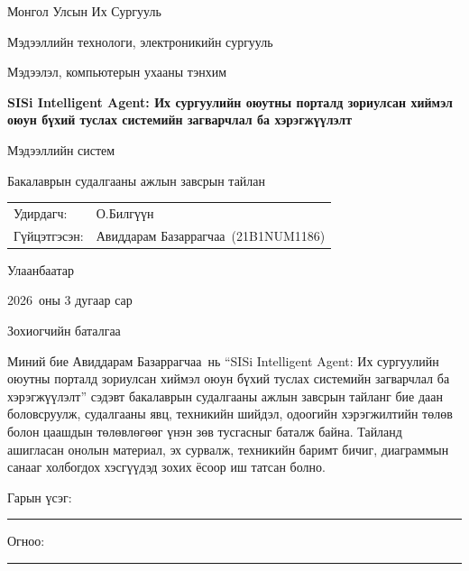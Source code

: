 \documentclass[12pt,a4paper]{report}
\newcommand{\UniversityName}{Монгол Улсын Их Сургууль}
\newcommand{\SchoolName}{Мэдээллийн технологи, электроникийн сургууль}
\newcommand{\DepartmentName}{Мэдээлэл, компьютерын ухааны тэнхим}
\newcommand{\ProgramName}{Мэдээллийн систем}
\newcommand{\StudentName}{Авиддарам Базаррагчаа}
\newcommand{\StudentCode}{21B1NUM1186}
\newcommand{\AdvisorName}{О.Билгүүн}
\newcommand{\ReportTitle}{SISi Intelligent Agent: Их сургуулийн оюутны порталд зориулсан хиймэл оюун бүхий туслах системийн загварчлал ба хэрэгжүүлэлт}
\newcommand{\ReportCity}{Улаанбаатар}
\newcommand{\ReportYear}{2026}
\begin{document}
\begin{titlepage}
  \begin{center}
    {\large \UniversityName \par}
    \vspace{0.2cm}
    {\large \SchoolName \par}
    \vspace{0.2cm}
    {\large \DepartmentName \par}

    \vfill

    {\bfseries\LARGE \ReportTitle \par}
    \vspace{0.6cm}
    {\large \ProgramName \par}
    \vspace{0.4cm}
    {\large Бакалаврын судалгааны ажлын завсрын тайлан \par}

    \vfill

    \begin{tabular}{p{5cm}p{8cm}}
      Удирдагч: & \AdvisorName \\
      Гүйцэтгэсэн: & \StudentName\ (\StudentCode) \\
    \end{tabular}

    \vfill

    {\large \ReportCity \par}
    {\large \ReportYear\ оны 3 дугаар сар \par}
  \end{center}
\end{titlepage}

\cleardoublepage
\thispagestyle{empty}
\begin{center}
  {\Large Зохиогчийн баталгаа}
\end{center}
\vspace{0.8cm}

Миний бие \StudentName\ нь ``\ReportTitle'' сэдэвт бакалаврын судалгааны ажлын завсрын тайланг бие даан боловсруулж, судалгааны явц, техникийн шийдэл, одоогийн хэрэгжилтийн төлөв болон цаашдын төлөвлөгөөг үнэн зөв тусгасныг баталж байна. Тайланд ашигласан онолын материал, эх сурвалж, техникийн баримт бичиг, диаграммын санааг холбогдох хэсгүүдэд зохих ёсоор иш татсан болно.

\vspace{1.4cm}
\noindent Гарын үсэг: \rule{6cm}{0.4pt}

\vspace{0.8cm}
\noindent Огноо: \rule{6cm}{0.4pt}
\end{document}
